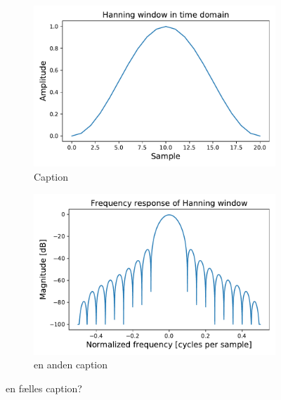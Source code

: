 \begin{figure}[H]
    \centering
    \begin{subfigure}[b]{.49\textwidth}
        \centering
        \includegraphics[width=\textwidth]{figures/HanningTime.pdf}
        \caption{Caption}
        \label{fig:hanningtime}
    \end{subfigure}
    \begin{subfigure}[b]{.49\textwidth}
        \centering
        \includegraphics[width=\textwidth]{figures/HanningFourier.pdf}
        \caption{en anden caption}
        \label{fig:hanningfourier}
    \end{subfigure}
\caption{en fælles caption?}
\label{fig: Hanning}
\end{figure}

